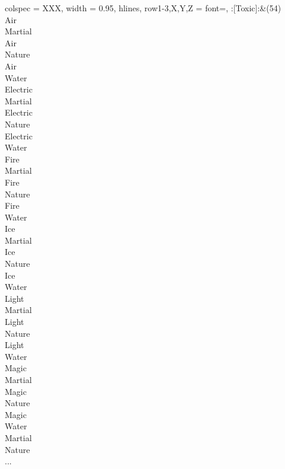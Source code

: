 \begin{longtblr}[
	caption = {2v1 Defending Weak},
	label = {2v1-Defending-Weak},
]{
	colspec = {XXX}, width = 0.95\linewidth,
	hlines,
	row{1-3,X,Y,Z} = {font=\bfseries},
}
	:[Toxic]:&{(54)\\
	Air \\
	Martial \\
	Air \\
	Nature \\
	Air \\
	Water \\
	Electric \\
	Martial \\
	Electric \\
	Nature \\
	Electric \\
	Water \\
	Fire \\
	Martial \\
	Fire \\
	Nature \\
	Fire \\
	Water \\
	Ice \\
	Martial \\
	Ice \\
	Nature \\
	Ice \\
	Water \\
	Light \\
	Martial \\
	Light \\
	Nature \\
	Light \\
	Water \\
	Magic \\
	Martial \\
	Magic \\
	Nature \\
	Magic \\
	Water \\
	Martial \\
	Nature \\
	...\\
	}\\


\end{longtblr}
